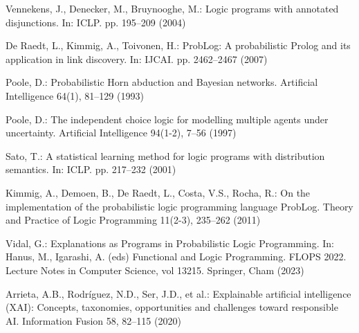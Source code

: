 \begin{singlespace}
\begin{thebibliography}{}
 Vennekens, J., Denecker, M., Bruynooghe, M.: Logic programs with annotated disjunctions. In: ICLP. pp. 195--209 (2004)

 De Raedt, L., Kimmig, A., Toivonen, H.: ProbLog: A probabilistic Prolog and its application in link discovery. In: IJCAI. pp. 2462--2467 (2007)

 Poole, D.: Probabilistic Horn abduction and Bayesian networks. Artificial Intelligence 64(1), 81--129 (1993)

 Poole, D.: The independent choice logic for modelling multiple agents under uncertainty. Artificial Intelligence 94(1-2), 7--56 (1997)

 Sato, T.: A statistical learning method for logic programs with distribution semantics. In: ICLP. pp. 217--232 (2001)

 Kimmig, A., Demoen, B., De Raedt, L., Costa, V.S., Rocha, R.: On the implementation of the probabilistic logic programming language ProbLog. Theory and Practice of Logic Programming 11(2-3), 235--262 (2011)

 Vidal, G.: Explanations as Programs in Probabilistic Logic Programming. In: Hanus, M., Igarashi, A. (eds) Functional and Logic Programming. FLOPS 2022. Lecture Notes in Computer Science, vol 13215. Springer, Cham (2023)

 Arrieta, A.B., Rodríguez, N.D., Ser, J.D., et al.: Explainable artificial intelligence (XAI): Concepts, taxonomies, opportunities and challenges toward responsible AI. Information Fusion 58, 82--115 (2020)

\end{thebibliography}

\end{singlespace}
